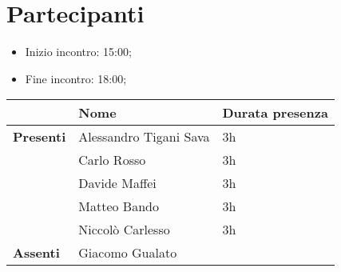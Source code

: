 \section{Partecipanti}

\begin{itemize}
    \item Inizio incontro: 15:00;
    \item Fine incontro: 18:00;
\end{itemize}


\begin{center}
{\renewcommand{\arraystretch}{1.5}
\begin{tabular}{lll}
	                    & \textbf{Nome}  			& \textbf{Durata presenza} \\
	\hline
	\textbf{Presenti}	& Alessandro Tigani Sava 	& 3h 					\\ 
						& Carlo Rosso 				& 3h 					\\
						& Davide Maffei 			& 3h 					\\
						& Matteo Bando 				& 3h 					\\
						& Niccolò Carlesso          & 3h					\\
	\hline
	\textbf{Assenti}	& Giacomo Gualato           &      					\\
\end{tabular}	
}
\end{center}